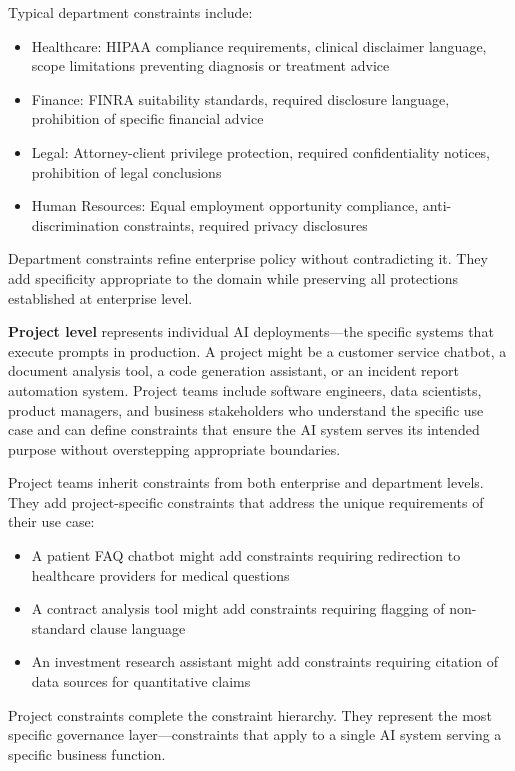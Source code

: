 Typical department constraints include:

\begin{itemize}
  \item Healthcare: HIPAA compliance requirements, clinical disclaimer language, scope limitations preventing diagnosis or treatment advice
  \item Finance: FINRA suitability standards, required disclosure language, prohibition of specific financial advice
  \item Legal: Attorney-client privilege protection, required confidentiality notices, prohibition of legal conclusions
  \item Human Resources: Equal employment opportunity compliance, anti-discrimination constraints, required privacy disclosures
\end{itemize}


Department constraints refine enterprise policy without contradicting it. They add specificity appropriate to the domain while preserving all protections established at enterprise level.

\textbf{Project level} represents individual AI deployments---the specific systems that execute prompts in production. A project might be a customer service chatbot, a document analysis tool, a code generation assistant, or an incident report automation system. Project teams include software engineers, data scientists, product managers, and business stakeholders who understand the specific use case and can define constraints that ensure the AI system serves its intended purpose without overstepping appropriate boundaries.

Project teams inherit constraints from both enterprise and department levels. They add project-specific constraints that address the unique requirements of their use case:

\begin{itemize}
  \item A patient FAQ chatbot might add constraints requiring redirection to healthcare providers for medical questions
  \item A contract analysis tool might add constraints requiring flagging of non-standard clause language
  \item An investment research assistant might add constraints requiring citation of data sources for quantitative claims
\end{itemize}


Project constraints complete the constraint hierarchy. They represent the most specific governance layer---constraints that apply to a single AI system serving a specific business function.

